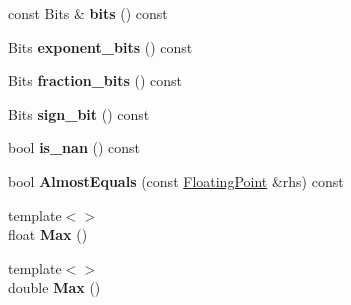 \begin{DoxyCompactItemize}
\item 
\hypertarget{classtesting_1_1internal_1_1_floating_point_abead51f16ec6ea84360a976da1cd1387}{}const Bits \& {\bfseries bits} () const \label{classtesting_1_1internal_1_1_floating_point_abead51f16ec6ea84360a976da1cd1387}

\item 
\hypertarget{classtesting_1_1internal_1_1_floating_point_af53c50b85408c582540d6244c026ce2b}{}Bits {\bfseries exponent\+\_\+bits} () const \label{classtesting_1_1internal_1_1_floating_point_af53c50b85408c582540d6244c026ce2b}

\item 
\hypertarget{classtesting_1_1internal_1_1_floating_point_aa0167b7b10a934b743ba3c1f47421e63}{}Bits {\bfseries fraction\+\_\+bits} () const \label{classtesting_1_1internal_1_1_floating_point_aa0167b7b10a934b743ba3c1f47421e63}

\item 
\hypertarget{classtesting_1_1internal_1_1_floating_point_a6176cc4d443724477f2799bcbd9f020a}{}Bits {\bfseries sign\+\_\+bit} () const \label{classtesting_1_1internal_1_1_floating_point_a6176cc4d443724477f2799bcbd9f020a}

\item 
\hypertarget{classtesting_1_1internal_1_1_floating_point_aaef2fd2cd8cdf791206a5e9fed8ef90d}{}bool {\bfseries is\+\_\+nan} () const \label{classtesting_1_1internal_1_1_floating_point_aaef2fd2cd8cdf791206a5e9fed8ef90d}

\item 
\hypertarget{classtesting_1_1internal_1_1_floating_point_adb0fe9ab1d9e5288f8e5550234211166}{}bool {\bfseries Almost\+Equals} (const \hyperlink{classtesting_1_1internal_1_1_floating_point}{Floating\+Point} \&rhs) const \label{classtesting_1_1internal_1_1_floating_point_adb0fe9ab1d9e5288f8e5550234211166}

\item 
\hypertarget{classtesting_1_1internal_1_1_floating_point_af2eda9331e679229a1baa3404b57b51d}{}{\footnotesize template$<$$>$ }\\float {\bfseries Max} ()\label{classtesting_1_1internal_1_1_floating_point_af2eda9331e679229a1baa3404b57b51d}

\item 
\hypertarget{classtesting_1_1internal_1_1_floating_point_afc2e85c0e886cb13b2300e961c9a9648}{}{\footnotesize template$<$$>$ }\\double {\bfseries Max} ()\label{classtesting_1_1internal_1_1_floating_point_afc2e85c0e886cb13b2300e961c9a9648}


\end{DoxyCompactItemize}
